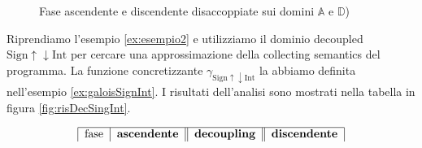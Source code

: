 \begin{figure}[H]
    \centering
    \caption{Fase ascendente e discendente disaccoppiate sui domini \(\mathbb{A}\) e \(\mathbb{D}\))}
    \label{fig:decFig}
\end{figure}

\begin{example}
Riprendiamo l'esempio \ref{ex:esempio2} e utilizziamo il dominio decoupled \(\textrm{Sign}\uparrow\downarrow\textrm{Int}\) per cercare una approssimazione della collecting semantics del programma. La funzione concretizzante \(\gamma_{\textrm{Sign}\uparrow\downarrow\textrm{Int}}\) la abbiamo definita nell'esempio \ref{ex:galoisSignInt}. I risultati dell'analisi sono mostrati nella tabella in figura \ref{fig:risDecSingInt}. 

\begin{table}[H]
\begin{minipage}{\textwidth}
    \centering
    \vspace{1cm}
        \[
        \begin{tabular}{|c|c|c|c||c||c|c|c||}
        \hline
        \multicolumn{2}{|c|}{fase} & 
        \multicolumn{2}{c||}{\textbf{ascendente}} & 
        \multicolumn{1}{c||}{\textbf{decoupling}} & 
        \multicolumn{2}{c|}{\textbf{discendente}}\\
        

\end{tabular}\]
\end{minipage}
\end{table}
\end{example}
